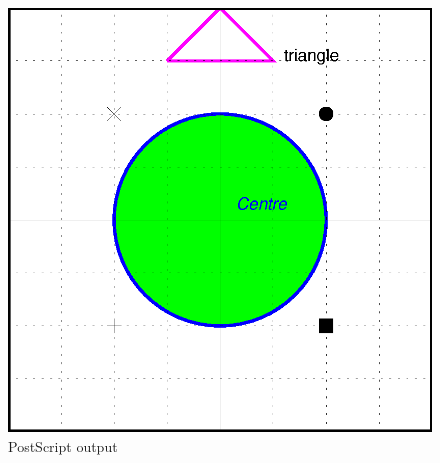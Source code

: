 \begin{figure}[h]
\begin{center}
\includegraphics{exemple.ps}
\end{center}
\caption{PostScript output}
\end{figure}


